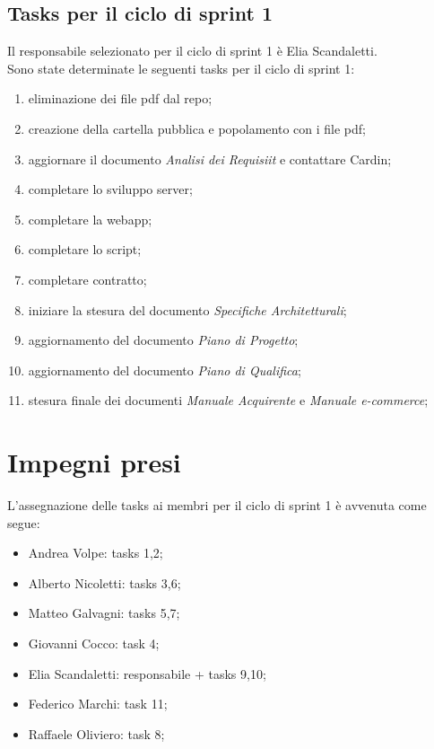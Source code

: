 \documentclass[a4paper, 12pt]{article}
\begin{document}
\subsection{Tasks per il ciclo di sprint 1}
Il responsabile selezionato per il ciclo di sprint 1 è Elia Scandaletti. \\
Sono state determinate le seguenti tasks per il ciclo di sprint 1:
\begin{enumerate}
	\item eliminazione dei file pdf dal repo;
	\item creazione della cartella pubblica e popolamento con i file pdf;
	\item aggiornare il documento \textit{Analisi dei Requisiit} e contattare Cardin;
	\item completare lo sviluppo server;
	\item completare la webapp;
	\item completare lo script;
	\item completare contratto;
	\item iniziare la stesura del documento \textit{Specifiche Architetturali};
	\item aggiornamento del documento \textit{Piano di Progetto};
	\item aggiornamento del documento \textit{Piano di Qualifica};
	\item stesura finale dei documenti \textit{Manuale Acquirente} e \textit{Manuale e-commerce}; \\

\end{enumerate}

\section{Impegni presi}
L'assegnazione delle tasks ai membri per il ciclo di sprint 1 è avvenuta come segue:
\begin{itemize}
	\item Andrea Volpe: tasks 1,2;
	\item Alberto Nicoletti: tasks 3,6;
	\item Matteo Galvagni: tasks 5,7;
	\item Giovanni Cocco: task 4;
	\item Elia Scandaletti: responsabile + tasks 9,10;
	\item Federico Marchi: task 11;
	\item Raffaele Oliviero: task 8;
\end{itemize}


\begin{itemize}

\end{itemize}
\end{document}
